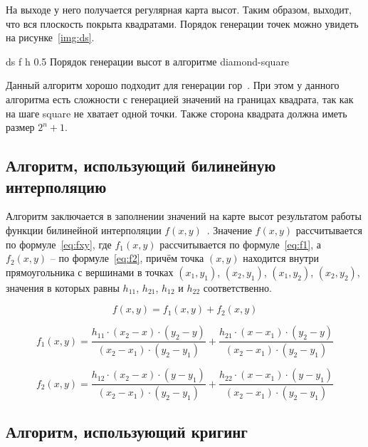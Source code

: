 На выходе у него получается регулярная карта высот. Таким образом, выходит, что вся плоскость покрыта квадратами. Порядок генерации точек можно увидеть на рисунке~\ref{img:ds}. 

\FloatBarrier
{}
{ds} %
{f} %
{h} %
{0.5\textwidth} %
{Порядок генерации высот в алгоритме diamond-square~\cite{images}} %
\FloatBarrier

Данный алгоритм хорошо подходит для генерации гор~\cite{landscapes}. При этом у данного алгоритма есть сложности с генерацией значений на границах квадрата, так как на шаге square не хватает одной точки. Также сторона квадрата должна иметь размер $2^n+1$.   
 
\subsection{Алгоритм, использующий билинейную интерполяцию}
 
Алгоритм заключается в заполнении значений на карте высот результатом работы функции билинейной интерполяции $f(x, y)$~\cite{Voronezh}. Значение $f(x, y)$ рассчитывается по формуле~\ref{eq:fxy}, где $f_1(x,y)$ рассчитывается по формуле~\ref{eq:f1}, а $f_2(x,y)$ -- по формуле~\ref{eq:f2}, причём точка $(x, y)$ находится внутри прямоугольника с вершинами в точках $(x_1, y_1)$, $(x_2, y_1)$, $(x_1, y_2)$, $(x_2, y_2)$, значения в которых равны $h_{11}$, $h_{21}$, $h_{12}$ и $h_{22}$ соответственно. 

\begin{equation}
	\label{eq:fxy}
	f(x,y)=f_1(x,y)+f_2(x,y)
\end{equation}

\begin{equation}
	\label{eq:f1}
	f_1(x,y)=\frac{h_{11}\cdot(x_2-x)\cdot(y_2-y)}{(x_2-x_1)\cdot(y_2-y_1)}+\frac{h_{21}\cdot(x-x_1)\cdot(y_2-y)}{(x_2-x_1)\cdot(y_2-y_1)}
\end{equation}

\begin{equation}
	\label{eq:f2}
	f_2(x,y)=\frac{h_{12}\cdot(x_2-x)\cdot(y-y_1)}{(x_2-x_1)\cdot(y_2-y_1)}+\frac{h_{22}\cdot(x-x_1)\cdot(y-y_1)}{(x_2-x_1)\cdot(y_2-y_1)}
\end{equation}

\subsection{Алгоритм, использующий кригинг}

